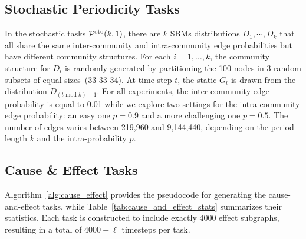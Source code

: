 \subsection{Stochastic Periodicity Tasks}\label{appendix:periodicity_stochastic_design}
In the stochastic tasks $\mathcal{P}^\text{sto}(k,1)$, there are $k$ SBMs distributions $D_1,\cdots, D_k$ that all share the same inter-community and intra-community edge probabilities but have different community structures. For each $i=1,\dots,k$, the community structure for $D_i$ is randomly generated by partitioning the 100 nodes in 3 random subsets of equal sizes~(33-33-34).  At time step $t$, the static $G_t$ is drawn from the distribution $D_{(t \text{ mod } k) +1}$. 
For all experiments, the inter-community edge probability is equal to 0.01 while we explore two settings for the intra-community edge probability: an easy one $p=0.9$ and a more challenging one $p=0.5$. The number of edges varies between 219,960 and 9,144,440, depending on the period length $k$ and the intra-probability $p$.


\subsection{Cause \& Effect Tasks}
Algorithm~\ref{alg:cause_effect} provides the pseudocode for generating the cause-and-effect tasks, while Table~\ref{tab:cause_and_effect_stats} summarizes their statistics. Each task is constructed to include exactly 4000 effect subgraphs, resulting in a total of \( 4000 + \ell \) timesteps per task.

